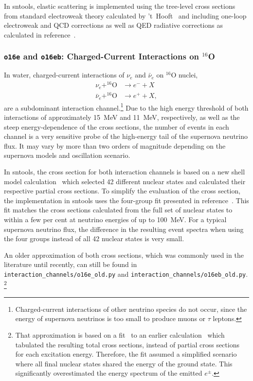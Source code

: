 \documentclass[11pt, oneside]{article}
\newcommand{\nue}{\ensuremath{\nu_e}\xspace}
\newcommand{\nuebar}{\ensuremath{\bar{\nu}_e}\xspace}
\begin{document}
In sntools, elastic scattering is implemented using the tree-level cross sections from standard electroweak theory calculated by ’t~Hooft~\cite{t-Hooft1971} and including one-loop electroweak and QCD corrections as well as QED radiative corrections as calculated in reference~\cite{Bahcall1995}.


\subsubsection{\texttt{o16e} and \texttt{o16eb}: Charged-Current Interactions on $^{16}$O}
In water, charged-current interactions of \nue and \nuebar on $^{16}$O nuclei,
\begin{align}
\nue + ^{16}\text{O} &\rightarrow e^- + X \\
\nuebar + ^{16}\text{O} &\rightarrow e^+ + X,
\end{align}
are a subdominant interaction channel.\footnote{\label{fn:cc-interactions}Charged-current interactions of other neutrino species do not occur, since the energy of supernova neutrinos is too small to produce muons or $\tau$ leptons.}
Due to the high energy threshold of both interactions of approximately \SI{15}{MeV} and \SI{11}{MeV}, respectively, as well as the steep energy-dependence of the cross sections, the number of events in each channel is a very sensitive probe of the high-energy tail of the supernova neutrino flux.
It may vary by more than two orders of magnitude depending on the supernova models and oscillation scenario.

In sntools, the cross section for both interaction channels is based on a new shell model calculation~\cite{Suzuki2018} which selected 42 different nuclear states and calculated their respective partial cross sections.
To simplify the evaluation of the cross section, the implementation in sntools uses the four-group fit presented in reference~\cite{Nakazato2018}.
This fit matches the cross sections calculated from the full set of nuclear states to within a few per cent at neutrino energies of up to \SI{100}{MeV}.
For a typical supernova neutrino flux, the difference in the resulting event spectra when using the four groups instead of all 42 nuclear states is very small.

An older approximation of both cross sections, which was commonly used in the literature until recently, can still be found in \texttt{interaction\_channels/o16e\_old.py} and \texttt{interaction\_channels/o16eb\_old.py}.%
\footnote{That approximation is based on a fit~\cite{Tomas2003} to an earlier calculation~\cite{Kolbe2002} which tabulated the resulting total cross sections, instead of partial cross sections for each excitation energy.
Therefore, the fit assumed a simplified scenario where all final nuclear states shared the energy of the ground state.
This significantly overestimated the energy spectrum of the emitted $e^\pm$.}
\end{document}
